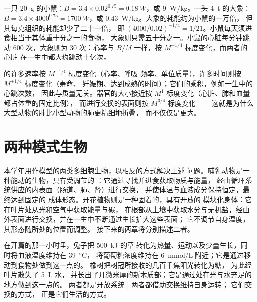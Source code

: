 \begin{example}[小鼠与大象]\label{ex:b1:organism-environment:mouseelephant}
一只 \qty{20}{g} 的小鼠：$B = 3.4\times 0.02^{0.75} = \qty{0.18}{W}$，或
\qty{9}{W/kg}。一头 \qty{4}{t} 的大象：$B = 3.4\times 4000^{0.75} =
\qty{1700}{W}$，或 \qty{0.43}{W/kg}。大象的耗能约为小鼠的一万倍，
但其每克组织的耗能却少了二十一倍，
即 $(4000/0.02)^{-1/4} = 1/21$。小鼠每天须进食相当于其体重十分之一的食物，
大象则只需五十分之一。小鼠的心脏每分钟跳动
\qty{600}{} 次，大象则为 \qty{30}{} 次：心率与
$B/M$ 一样，按 $M^{-1/4}$ 标度变化，而两者的心脏
在一生中都大约跳动十亿次。
\end{example}

\begin{remark}[两种标度指数及其推论]\label{rem:b1:organism-environment:consequences}
的许多速率按 $M^{-1/4}$ 标度变化（心率、呼吸
频率、单位质量），许多时间则按 $M^{+1/4}$ 标度变化（寿命、
妊娠期、达到成熟的时间）；它们的乘积，例如一生中的心跳次数，
因此与质量无关。器官的大小接近按
$M^{1}$ 标度变化（心脏、肺和血量都占体重的固定比例），
而进行交换的表面则按 $M^{3/4}$ 标度变化——
这就是为什么大型动物的肺比小型动物的肺更精细地折叠，
而不仅仅是更大。
\end{remark}

\section{两种模式生物}

\begin{proposition}[一种哺乳动物与一种开花植物]\label{prop:b1:organism-environment:models}
本学年用作模型的两类多细胞生物，以相反的方式解决上述
问题。哺乳动物是一种能动的生物，具有受调节的
：它通过寻找并进食获取物质与能量，
经由循环系统供应的内表面（肠道、肺、肾）进行交换，
并使体温与血液成分保持恒定，最终达到固定的
成体形态。开花植物则是一种固着的，具有开放的
模块化身体：它在叶片处从光和空气中获取能量与碳，
在根部从土壤中获取水分与无机盐，经由
外表面进行交换，并在一生中不断通过生长扩大这些表面；
它不调节自身温度，
其形态随所处的位置而调整。
接下来的两章将分别描述二者。
\end{proposition}

\begin{example}\label{ex:b1:organism-environment:budgets}
在开篇的那一小时里，兔子把 \qty{500}{kJ} 的草
转化为热量、运动以及少量生长，同时将血液温度维持在 \qty{39}{\celsius}，
将葡萄糖浓度维持在 \qty{6}{mmol/L} 附近；它是通过移动到食物处做到这一点的。
橡树把树冠所接收的几百千焦阳光转化为糖，
为此经叶片散失了 \qty{5}{L} 水，
并长出了几微米厚的新木质部；它是通过处在光与水充足的地方做到这一点的。
两者都是开放系统；两者都借助交换维持自身运转；
它们交换的方式，
正是它们生活的方式。
\end{example}

